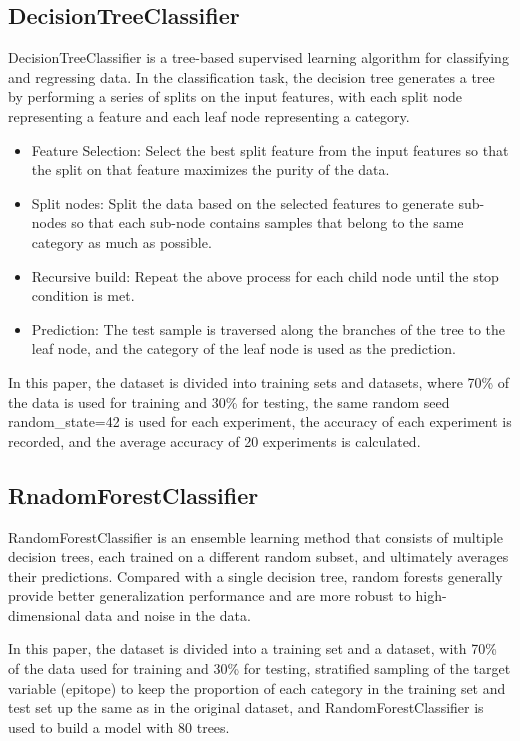 \documentclass[conference]{IEEEtran}
\begin{document}
	\subsection{DecisionTreeClassifier}\label{AA}
	DecisionTreeClassifier is a tree-based supervised learning algorithm for classifying and regressing data. In the classification task, the decision tree generates a tree by performing a series of splits on the input features, with each split node representing a feature and each leaf node representing a category.
	\begin{itemize}
		\item Feature Selection: Select the best split feature from the input features so that the split on that feature maximizes the purity of the data.
		\item Split nodes: Split the data based on the selected features to generate sub-nodes so that each sub-node contains samples that belong to the same category as much as possible.
		\item Recursive build: Repeat the above process for each child node until the stop condition is met.
		\item Prediction: The test sample is traversed along the branches of the tree to the leaf node, and the category of the leaf node is used as the prediction.
	\end{itemize}
	
	In this paper, the dataset is divided into training sets and datasets, where 70\% of the data is used for training and 30\% for testing, the same random seed random\_state=42 is used for each experiment, the accuracy of each experiment is recorded, and the average accuracy of 20 experiments is calculated.
	
	\subsection{RnadomForestClassifier}\label{AA}
	RandomForestClassifier is an ensemble learning method that consists of multiple decision trees, each trained on a different random subset, and ultimately averages their predictions. Compared with a single decision tree, random forests generally provide better generalization performance and are more robust to high-dimensional data and noise in the data.
	
	In this paper, the dataset is divided into a training set and a dataset, with 70\% of the data used for training and 30\% for testing, stratified sampling of the target variable (epitope) to keep the proportion of each category in the training set and test set up the same as in the original dataset, and RandomForestClassifier is used to build a model with 80 trees.
	
\end{document}
